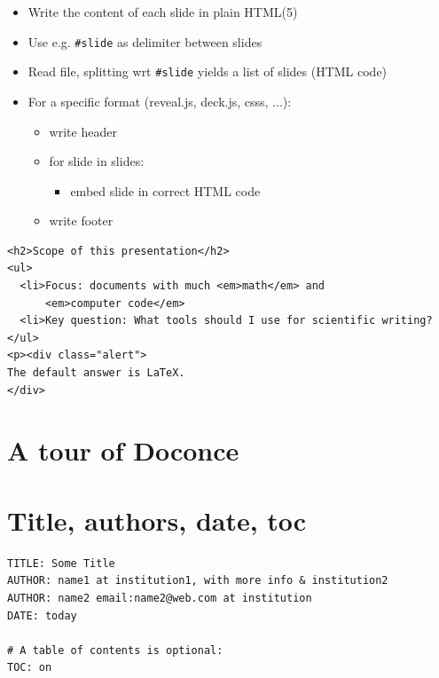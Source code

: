 \documentclass[%
twoside,                 %
final,                   %
chapterprefix=true,      %
open=right               %
10pt]{book}
\begin{document}
\begin{itemize}
 \item Write the content of each slide in plain HTML(5)

 \item Use e.g. \Verb!#slide! as delimiter between slides

 \item Read file, splitting wrt \Verb!#slide! yields a list of
   slides (HTML code)

 \item For a specific format (reveal.js, deck.js, csss, ...):
\begin{itemize}

    \item write header

    \item for slide in slides:
\begin{itemize}

      \item embed slide in correct HTML code

\end{itemize}

\noindent
    \item write footer
\end{itemize}

\noindent
\end{itemize}

\noindent
\begin{Verbatim}[numbers=none,fontsize=\fontsize{9pt}{9pt},baselinestretch=0.95]
<h2>Scope of this presentation</h2>
<ul>
  <li>Focus: documents with much <em>math</em> and
      <em>computer code</em>
  <li>Key question: What tools should I use for scientific writing?
</ul>
<p><div class="alert">
The default answer is LaTeX.
</div>
\end{Verbatim}


\section*{A tour of Doconce}

\section*{Title, authors, date, toc}

\begin{Verbatim}[numbers=none,fontsize=\fontsize{9pt}{9pt},baselinestretch=0.95]
TITLE: Some Title
AUTHOR: name1 at institution1, with more info & institution2
AUTHOR: name2 email:name2@web.com at institution
DATE: today

# A table of contents is optional:
TOC: on
\end{Verbatim}
\end{document}
